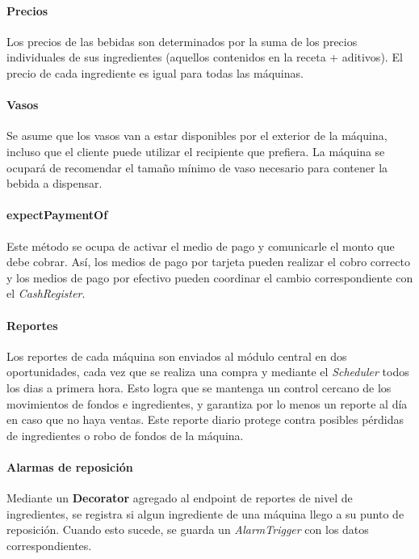 \documentclass[a4paper,10pt]{extarticle}
\begin{document}
        \paragraph{Precios}
        Los precios de las bebidas son determinados por la suma de los precios individuales de sus ingredientes (aquellos contenidos en la receta + aditivos). El precio de cada ingrediente es igual para todas las máquinas.

        \paragraph{Vasos}
        Se asume que los vasos van a estar disponibles por el exterior de la máquina, incluso que el cliente puede utilizar el recipiente que prefiera. La máquina se ocupará de recomendar el tamaño mínimo de vaso necesario para contener la bebida a dispensar.

        \paragraph{expectPaymentOf}
        Este método se ocupa de activar el medio de pago y comunicarle el monto que debe cobrar. Así, los medios de pago por tarjeta pueden realizar el cobro correcto y los medios de pago por efectivo pueden coordinar el cambio correspondiente con el \textit{CashRegister}.

        \paragraph{Reportes}
        Los reportes de cada máquina son enviados al módulo central en dos oportunidades, cada vez que se realiza una compra y mediante el \textit{Scheduler} todos los dias a primera hora. Esto logra que se mantenga un control cercano de los movimientos de fondos e ingredientes, y garantiza por lo menos un reporte al día en caso que no haya ventas. Este reporte diario protege contra posibles pérdidas de ingredientes o robo de fondos de la máquina. 

        \paragraph{Alarmas de reposición}
        Mediante un \textbf{Decorator} agregado al endpoint de reportes de nivel de ingredientes, se registra si algun ingrediente de una máquina llego a su punto de reposición. Cuando esto sucede, se guarda un \textit{AlarmTrigger} con los datos correspondientes.
\end{document}
